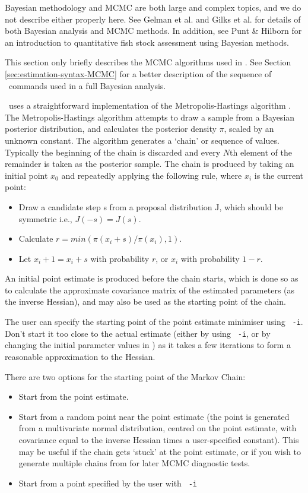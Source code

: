 Bayesian methodology and MCMC are both large and complex topics, and we do not describe either properly here. See Gelman et al. \citeyearpar{823} and Gilks et al. \citeyearpar{143} for details of both Bayesian analysis and MCMC methods. In addition, see Punt \& Hilborn \citeyearpar{828} for an introduction to quantitative fish stock assessment using Bayesian methods. 

This section only briefly describes the MCMC algorithms used in \CNAME. See Section \ref{sec:estimation-syntax-MCMC} for a better description of the sequence of \CNAME\ commands used in a full Bayesian analysis.

\CNAME\ uses a straightforward implementation of the Metropolis-Hastings algorithm \citep{823,143}. The Metropolis-Hastings algorithm attempts to draw a sample from a Bayesian posterior distribution, and calculates the posterior density $\pi$, scaled by an unknown constant. The algorithm generates a `chain' or sequence of values. Typically the beginning of the chain is discarded and every $N$th element of the remainder is taken as the posterior sample. The chain is produced by taking an initial point $x_0$ and repeatedly applying the following rule, where $x_i$ is the current point: 

\begin{itemize}
\item Draw a candidate step s from a proposal distribution J, which should be symmetric i.e., $J(-s)=J(s)$.
\item Calculate $r=min(\pi(x_i+s)/\pi(x_i),1)$. 
\item Let $x_i+1=x_i+s$ with probability $r$, or $x_i$ with probability $1-r$.
\end{itemize}

An initial point estimate is produced before the chain starts, which is done so as to calculate the approximate covariance matrix of the estimated parameters (as the inverse Hessian), and may also be used as the starting point of the chain. 

The user can specify the starting point of the point estimate minimiser using \texttt{\cname\ -i}. Don't start it too close to the actual estimate (either by using \texttt{\cname\ -i}, or by changing the initial parameter values in \config) as it takes a few iterations to form a reasonable approximation to the Hessian. 

There are two options for the starting point of the Markov Chain: 

\begin{itemize}
\item Start from the point estimate.
\item Start from a random point near the point estimate (the point is generated from a multivariate normal distribution, centred on the point estimate, with covariance equal to the inverse Hessian times a user-specified constant). This may be useful if the chain gets `stuck' at the point estimate, or if you wish to generate multiple chains from  for later MCMC diagnostic tests.
\item Start from a point specified by the user with \texttt{\cname\ -i} \COO
\end{itemize}

